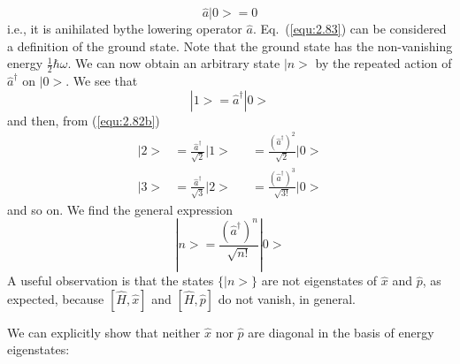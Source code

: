 \begin{equation}
  \hat{a}|0> = 0
  \label{equ:2.83}
\end{equation}
i.e., it is anihilated bythe lowering operator $\hat{a}$.
Eq.~(\ref{equ:2.83}) can be considered a definition of the
ground state. Note that the ground state has the
non-vanishing energy $\displaystyle{\frac{1}{2}\hbar
\omega}$.
We can now obtain an arbitrary state $|n>$ by the repeated
action of $\hat{a}^{\dagger}$ on $|0>$. We see that
\begin{equation}
  |1> = \hat{a}^{\dagger} |0>
  \label{equ:2.84}
\end{equation}
and then, from (\ref{equ:2.82b})
\begin{subequations}
  \begin{alignat}{2}
    |2> &= \frac{\hat{a}^{\dagger}}{\sqrt{2}} |1> &&=
    \frac{(\hat{a}^{\dagger})^2}{\sqrt{2}} |0>
    \label{equ:2.85a} \\
    |3> &= \frac{\hat{a}^{\dagger}}{\sqrt{3}} |2> &&=
    \frac{(\hat{a}^{\dagger})^3}{\sqrt{3!}} |0>
    \label{equ:2.85b}
  \end{alignat}
\end{subequations}
and so on. We find the general expression
\begin{equation}
  |n> = \frac{(\hat{a}^{\dagger})^n}{\sqrt{n!}} |0>
  \label{equ:2.86}
\end{equation}
A useful observation is that the states $\{|n>\}$ are not
eigenstates of $\hat{x}$ and $\hat{p}$, as expected, because
$[\hat{H},\hat{x}]$ and $[\hat{H}, \hat{p}]$ do not vanish,
in general.

We can explicitly show that neither $\hat{x}$ nor $\hat{p}$
are diagonal in the basis of energy eigenstates:

